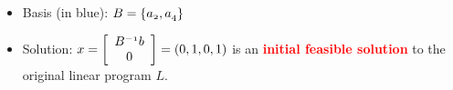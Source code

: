 \documentclass[mathserif]{beamer}
\begin{document}
{\begin{scriptsize}
\begin{itemize}
 \item Basis (in blue):  \textcolor{blue}{$\mathnormal{B =\{a_2, a_4 \} }$}
 \item Solution: $\mathnormal{x=\left[\begin{array}{c}\mathnormal{B^{-1}b}\\{0}\end{array}\right]}= ( 0, 1, 0, 1 )$ is an \textcolor{red}{\bf initial  feasible solution} to the original linear program $L$. 
 \end{itemize}

\end{scriptsize}
}



%
%
%
%
%
%
\end{document}
